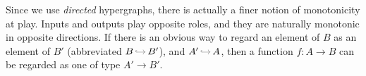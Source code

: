 \begin{wrapfigure}[4]{o}{1.8cm}
    \vspace{-3ex}
\end{wrapfigure}
Since we use \emph{directed} hypergraphs,
     there is actually a finer notion of monotonicity at play. 
Inputs and outputs play opposite roles, 
    and they are naturally monotonic in opposite directions. 
If there is an obvious way to regard an element of $B$ as an element of $B'$ (abbreviated $B \,{\color{gray}\hookrightarrow}\, B'$),
and $A' \,{\color{gray}\hookrightarrow}\, A$, 
then
a function $f : A \to B$ can be regarded as one of type $A'\to B'$.
